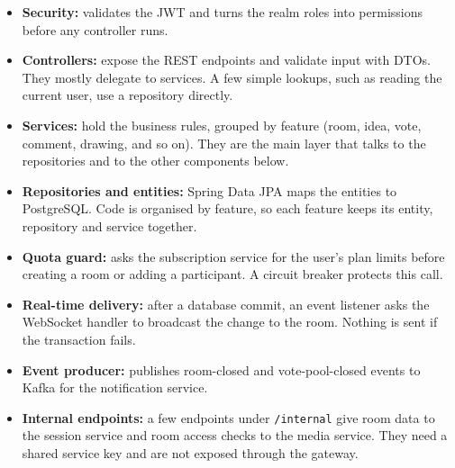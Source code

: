 \documentclass[12pt,a4paper]{report}
\begin{document}
\begin{itemize}
  \item \textbf{Security:} validates the JWT and turns the realm roles into permissions before any controller runs.
  \item \textbf{Controllers:} expose the REST endpoints and validate input with DTOs. They mostly delegate to services. A few simple lookups, such as reading the current user, use a repository directly.
  \item \textbf{Services:} hold the business rules, grouped by feature (room, idea, vote, comment, drawing, and so on). They are the main layer that talks to the repositories and to the other components below.
  \item \textbf{Repositories and entities:} Spring Data JPA maps the entities to PostgreSQL. Code is organised by feature, so each feature keeps its entity, repository and service together.
  \item \textbf{Quota guard:} asks the subscription service for the user's plan limits before creating a room or adding a participant. A circuit breaker protects this call.
  \item \textbf{Real-time delivery:} after a database commit, an event listener asks the WebSocket handler to broadcast the change to the room. Nothing is sent if the transaction fails.
  \item \textbf{Event producer:} publishes room-closed and vote-pool-closed events to Kafka for the notification service.
  \item \textbf{Internal endpoints:} a few endpoints under \texttt{/internal} give room data to the session service and room access checks to the media service. They need a shared service key and are not exposed through the gateway.
\end{itemize}
\end{document}

